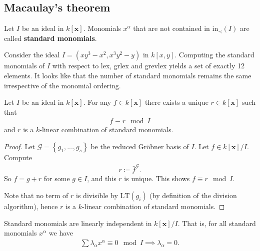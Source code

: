 \documentclass[a4paper, 11pt]{article}
\begin{document}
\subsection{Macaulay's theorem}


\begin{defi}
  Let \( I \) be an ideal in \( k[\mathbf x] \). Monomials \( x^\alpha \) that are not contained in \( \mathrm{in}_\prec(I) \) are called \textbf{standard monomials}.
\end{defi}

\begin{eg}
Consider the ideal \( I = (xy^3 - x^2, x^3 y^2 - y) \) in \( k[x,y] \). Computing the standard monomials of \( I \) with respect to lex, grlex and grevlex yields a set of exactly 12 elements. It looks like that the number of standard monomials remains the same irrespective of the monomial ordering.
\end{eg}

\begin{prop}\label{aisdioasdj}
  Let \( I \) be an ideal in \( k[\mathbf x] \). For any \( f \in k[\mathbf x]\) there exists a unique \( r \in k[\mathbf x] \) such that 
  \begin{align*}
    f \equiv r \mod I
  \end{align*}
  and \( r \) is a \( k \)-linear combination of standard monomials. 
\end{prop}

\begin{proof}
  Let \( \mathcal{G} =\left\{ g_1,...,g_s \right\} \) be the reduced Gröbner basis of \( I \). Let \( f \in k[\mathbf x] / I \). Compute 
  \begin{align*}
    r \coloneqq \bar f^{\mathcal{G}}.
  \end{align*}
  So \( f = g + r \) for some \( g \in I \), and this \( r \) is unique. This shows \( f \equiv r \mod I \).

  Note that no term of \( r \) is divisible by \( \mathrm{LT}(g_i) \) (by definition of the division algorithm), hence \( r \) is a \( k \)-linear combination of standard monomials.
\end{proof}

\begin{prop}
  Standard monomials are linearly independent in \( k[\mathbf x] / I \). That is, for all standard monomials \( x^\alpha \) we have 
  \begin{align*}
    \sum \lambda_\alpha x^\alpha \equiv 0 \mod I \implies \lambda_\alpha = 0.
  \end{align*}
\end{prop}
\end{document}
